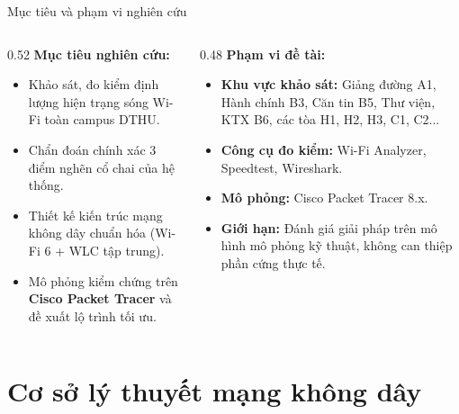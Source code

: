 \documentclass[fleqn]{beamer}
\begin{document}
\begin{frame}{Mục tiêu và phạm vi nghiên cứu}
  \begin{columns}
    \begin{column}{0.52\textwidth}
      \textbf{Mục tiêu nghiên cứu:}
      \begin{itemize}\small
        \item Khảo sát, đo kiểm định lượng hiện trạng sóng Wi-Fi toàn campus DTHU.
        \item Chẩn đoán chính xác 3 điểm nghẽn cổ chai của hệ thống.
        \item Thiết kế kiến trúc mạng không dây chuẩn hóa (Wi-Fi 6 + WLC tập trung).
        \item Mô phỏng kiểm chứng trên \textbf{Cisco Packet Tracer} và đề xuất lộ trình tối ưu.
      \end{itemize}
    \end{column}
    \begin{column}{0.48\textwidth}
      \textbf{Phạm vi đề tài:}
      \begin{itemize}\small
        \item \textbf{Khu vực khảo sát:} Giảng đường A1, Hành chính B3, Căn tin B5, Thư viện, KTX B6, các tòa H1, H2, H3, C1, C2...
        \item \textbf{Công cụ đo kiểm:} Wi-Fi Analyzer, Speedtest, Wireshark.
        \item \textbf{Mô phỏng:} Cisco Packet Tracer 8.x.
        \item \textbf{Giới hạn:} Đánh giá giải pháp trên mô hình mô phỏng kỹ thuật, không can thiệp phần cứng thực tế.
      \end{itemize}
    \end{column}
  \end{columns}
\end{frame}

\section{Cơ sở lý thuyết mạng không dây}
\end{document}
